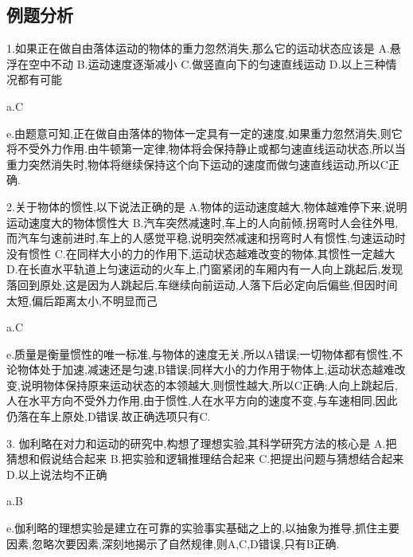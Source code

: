 \subsection{例题分析}
\begin{selection}
  1.如果正在做自由落体运动的物体的重力忽然消失,那么它的运动状态应该是
  A.悬浮在空中不动
  B.运动速度逐渐减小
  C.做竖直向下的匀速直线运动
  D.以上三种情况都有可能

  a.C

  e.由题意可知,正在做自由落体的物体一定具有一定的速度,如果重力忽然消失,则它将不受外力作用.由牛顿第一定律,物体将会保持静止或都匀速直线运动状态,所以当重力突然消失时,物体将继续保持这个向下运动的速度而做匀速直线运动,所以C正确.

  2.关于物体的惯性,以下说法正确的是
  A.物体的运动速度越大,物体越难停下来,说明运动速度大的物体惯性大
  B.汽车突然减速时,车上的人向前倾,拐弯时人会往外甩,而汽车匀速前进时,车上的人感觉平稳,说明突然减速和拐弯时人有惯性,匀速运动时没有惯性
  C.在同样大小的力的作用下,运动状态越难改变的物体,其惯性一定越大
  D.在长直水平轨道上匀速运动的火车上,门窗紧闭的车厢内有一人向上跳起后,发现落回到原处,这是因为人跳起后,车继续向前运动,人落下后必定向后偏些,但因时间太短,偏后距离太小,不明显而己

  a.C

  e.质量是衡量惯性的唯一标准,与物体的速度无关,所以A错误;一切物体都有惯性,不论物体处于加速,减速还是匀速,B错误;同样大小的力作用于物体上,运动状态越难改变,说明物体保持原来运动状态的本领越大,则惯性越大,所以C正确;人向上跳起后,人在水平方向不受外力作用,由于惯性,人在水平方向的速度不变,与车速相同,因此仍落在车上原处,D错误.故正确选项只有C.

3. 伽利略在对力和运动的研究中,构想了理想实验,其科学研究方法的核心是
A.把猜想和假说结合起来
B.把实验和逻辑推理结合起来
C.把提出问题与猜想结合起来
D.以上说法均不正确

a.B

e.伽利略的理想实验是建立在可靠的实验事实基础之上的,以抽象为推导,抓住主要因素,忽略次要因素,深刻地揭示了自然规律,则A,C,D错误,只有B正确.

\end{selection}
